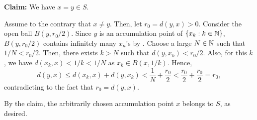 \begin{enumerate}
\begin{pf}
\textbf{Claim:} We have \(x=y\in S\).

\begin{pf}
Assume to the contrary that \(x\ne y\). Then, let \(r_0=d(y,x)>0\). Consider
the open ball \(B(y,r_0/2)\). Since \(y\) is an accumulation point of
\(\{x_k:k\in\mathbb{N}\}\), \(B(y,r_0/2)\) contains infinitely many \(x_n\)'s by
. Choose a large \(N\in\mathbb{N}\) such that \(1/N<r_0/2\).
Then, there exists \(k>N\) such that \(d(y,x_k)<r_0/2\). Also, for this \(k\),
we have \(d(x_k,x)<1/k<1/N\) as \(x_k\in B(x,1/k)\). Hence,
\[
d(y,x)\le d(x_k,x)+d(y,x_k)
<\frac{1}{N}+\frac{r_0}{2}
<\frac{r_0}{2}+\frac{r_0}{2}
=r_0,
\]
contradicting to the fact that \(r_0=d(y,x)\).
\end{pf}

By the claim, the arbitrarily chosen accumulation point \(x\) belongs to \(S\),
as desired.
\end{pf}
\end{enumerate}

